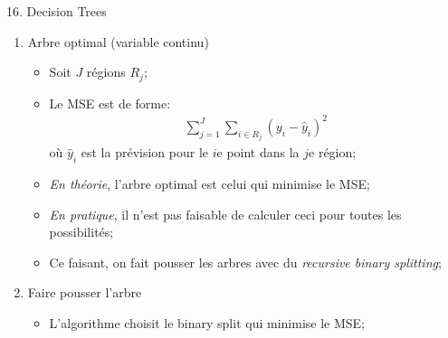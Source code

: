 \documentclass[12pt, titlepage, french]{report}
\begin{document}
\begin{CHPT_SUMM}[label = {DECISION-TREES}]{16. Decision Trees}
\begin{enumerate}
\begin{itemize}
\begin{itemize}
			\item[]	Chaque feuille correspond à une classe;
			\item	Nœud \textit{interne} (intermédiaire): Nœud se séparant en deux branches;
			\item[]	Chaque nœud interne correspond à un attribut;
			\end{itemize}
		\item	Nœuds dit \textit{Parent} et \textit{Child}: Un nœud séparé en sous-nœuds est le nœud \textit{parent} des sous-nœuds, et les sous-nœuds les nœuds \textit{child};
		\item	\textbf{Splitting} est la division d'un nœud en 2, ou plus, sous-nœuds;
		\item[]	Chaque split est \textit{binaire};
		\item	L'inverse est le \textbf{pruning}, le retrait de sous-nœuds;
		\item	\textbf{Types} de variables
			\begin{itemize}
			\item	Catégoriques:
			\item	Discrètes (count): 
			\item	Continues: 
			\item[]	Un \textit{cut point} doit être choisit dans le cas de variables continues
			\end{itemize}
		\end{itemize}
%		
	\item[]	Arbre optimal (variable continu)
		\begin{itemize}
		\item	Soit $J$ régions $R_{j}$;
		\item	Le MSE est de forme:
			\begin{align*}
			\sum_{j = 1}^{J}	\sum_{i \in R_{j}} (y_{i} - \hat{y}_{i})^{2}
			\end{align*}
				où $\hat{y}_{i}$ est la prévision pour le $i$e point dans la $j$e région;
		\item	\textit{En théorie}, l'arbre optimal est celui qui minimise le MSE;
		\item	\textit{En pratique}, il n'est pas faisable de calculer ceci pour toutes les possibilités;
		\item	Ce faisant, on fait pousser les arbres avec du \textit{recursive binary splitting};
		\end{itemize}
%		
	\item[]	Faire pousser l'arbre
		\begin{itemize}
		\item[]	L'algorithme choisit le binary split qui minimise le MSE;

\end{itemize}
\end{enumerate}
\end{CHPT_SUMM}
\end{document}
